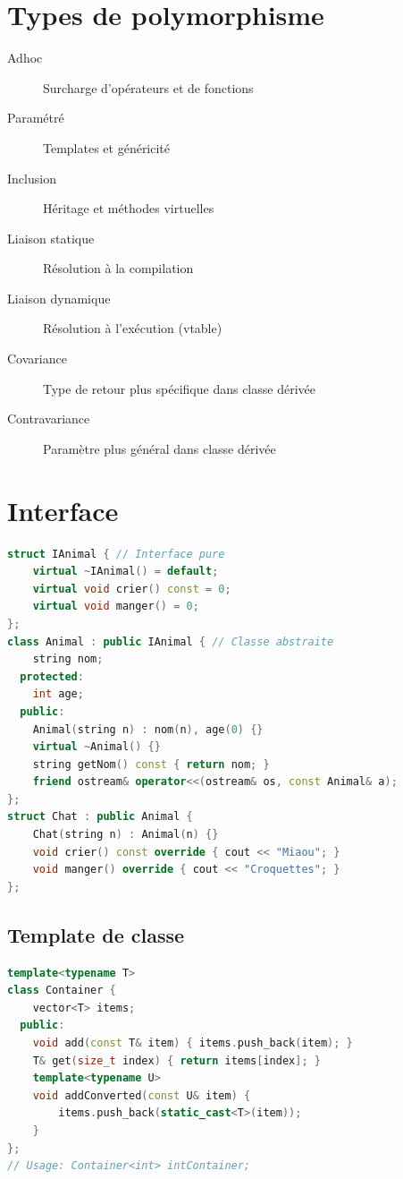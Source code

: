\documentclass{article}
\begin{document}
\begin{multicols*}{3}
\section*{Types de polymorphisme}
\begin{description}
\item[Adhoc] Surcharge d'opérateurs et de fonctions
\item[Paramétré] Templates et généricité
\item[Inclusion] Héritage et méthodes virtuelles
\item[Liaison statique] Résolution à la compilation
\item[Liaison dynamique] Résolution à l'exécution (vtable)
\item[Covariance] Type de retour plus spécifique dans classe dérivée
\item[Contravariance] Paramètre plus général dans classe dérivée
\end{description}

\section*{Interface}
\begin{lstlisting}[language=C++]
struct IAnimal { // Interface pure
    virtual ~IAnimal() = default;
    virtual void crier() const = 0;
    virtual void manger() = 0;
};
class Animal : public IAnimal { // Classe abstraite
    string nom;
  protected:
    int age;
  public:
    Animal(string n) : nom(n), age(0) {}
    virtual ~Animal() {}
    string getNom() const { return nom; }
    friend ostream& operator<<(ostream& os, const Animal& a);
};
struct Chat : public Animal {
    Chat(string n) : Animal(n) {}
    void crier() const override { cout << "Miaou"; }
    void manger() override { cout << "Croquettes"; }
};
\end{lstlisting}

\subsection*{Template de classe}
\begin{lstlisting}[language=C++]
template<typename T>
class Container {
    vector<T> items;
  public:
    void add(const T& item) { items.push_back(item); }
    T& get(size_t index) { return items[index]; }
    template<typename U>
    void addConverted(const U& item) {
        items.push_back(static_cast<T>(item));
    }
};
// Usage: Container<int> intContainer;
\end{lstlisting}


\end{multicols*}
\end{document}
